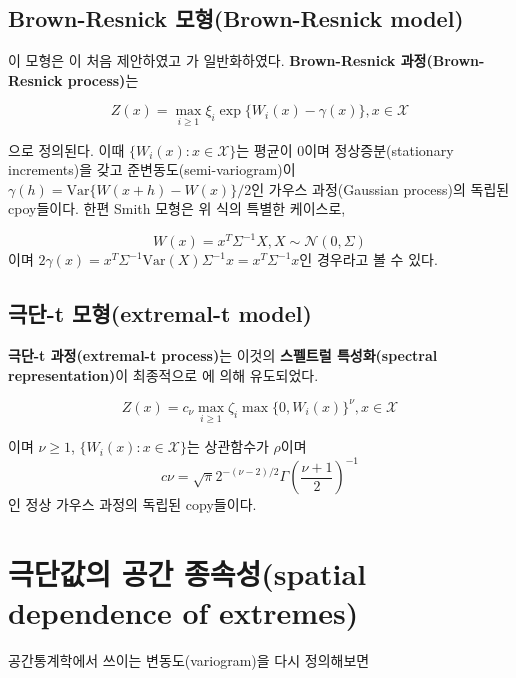 \documentclass[b5paper,]{scrbook}
\theoremstyle{plain}
\theoremstyle{definition}
\numberwithin{equation}{section}
\begin{document}
\hypertarget{brown-resnick-brown-resnick-model}{%
\subsection{Brown-Resnick 모형(Brown-Resnick model)}\label{brown-resnick-brown-resnick-model}}

이 모형은 \citep{Brown1977}이 처음 제안하였고 \citep{Kabluchko2009a}가 일반화하였다. \textbf{Brown-Resnick 과정(Brown-Resnick process)}는

\[
\begin{equation}
Z(x)=\max_{i\geq 1}\xi_{i}\exp\{W_{i}(x)-\gamma(x)\},x\in\mathcal{X}
\end{equation}
\]

으로 정의된다. 이때 \(\{W_{i}(x): x\in\mathcal{X}\}\)는 평균이 0이며 정상증분(stationary increments)을 갖고 준변동도(semi-variogram)이 \(\gamma(h)=\text{Var}\{W(x+h)-W(x)\}/2\)인 가우스 과정(Gaussian process)의 독립된 cpoy들이다. 한편 Smith 모형은 위 식의 특별한 케이스로,

\[W(x)=x^{T}\Sigma^{-1}X, X\sim\mathcal{N}(0,\Sigma)\]
이며 \(2\gamma(x)=x^{T}\Sigma^{-1}\text{Var}(X)\Sigma^{-1}x=x^{T}\Sigma^{-1}x\)인 경우라고 볼 수 있다.

\hypertarget{-t-extremal-t-model}{%
\subsection{극단-t 모형(extremal-t model)}\label{-t-extremal-t-model}}

\textbf{극단-t 과정(extremal-t process)}는 이것의 \textbf{스펠트럴 특성화(spectral representation)}이 최종적으로 \citep{Opitz2013}에 의해 유도되었다.

\[
\begin{equation}
Z(x)=c_{\nu}\max_{i \geq 1}\zeta_{i}\max\{0,W_{i}(x)\}^{\nu}, x\in\mathcal{X}
\end{equation}
\]

이며 \(\nu \geq 1\), \(\{W_{i}(x):x\in\mathcal{X}\}\)는 상관함수가 \(\rho\)이며
\[c\nu =\sqrt{\pi}2^{-(\nu-2)/2}\Gamma(\frac{\nu+1}{2})^{-1}\]
인 정상 가우스 과정의 독립된 copy들이다.

\hypertarget{--spatial-dependence-of-extremes}{%
\section{극단값의 공간 종속성(spatial dependence of extremes)}\label{--spatial-dependence-of-extremes}}

공간통계학에서 쓰이는 변동도(variogram)을 다시 정의해보면
\end{document}
